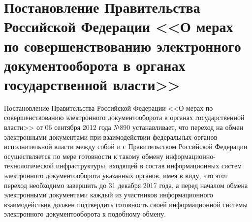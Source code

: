 \section{Постановление Правительства Российской Федерации <<О мерах по совершенствованию электронного документооборота в органах государственной власти>>} \label{rights_gov_890}

Постановление Правительства Российской Федерации <<О мерах по совершенствованию электронного документооборота в органах государственной власти>> от 06 сентября 2012 года №890 устанавливает, что переход на обмен электронными документами при взаимодействии федеральных органов исполнительной власти между собой и с Правительством Российской Федерации осуществляется по мере готовности к такому обмену информационно-технологической инфраструктуры, входящей в состав информационных систем электронного документооборота указанных органов, имея в виду, что этот переход необходимо завершить до 31 декабря 2017 года, а перед началом обмена электронными документами каждый из участников информационного взаимодействия должен подтвердить готовность своей информационной системы электронного документооборота к подобному обмену.